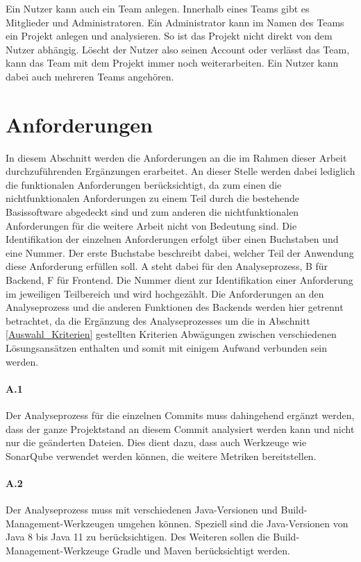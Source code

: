 \documentclass[
	oneside,  %
	ngerman, 
	final, 
	11pt, 
	a4paper, 
	1.1headlines, 
	headinclude=false, 
	footinclude=false, 
	mpinclude=false, 
	pagesize, 
	onecolumn, 
	titlepage, 
	parskip=half, 
	headsepline, 
	chapterprefix=false, 
	version=first, 
	listof=totoc, 
	bibliography=totoc, 
	toc=graduated, 
	fleqn
]{scrbook}
\begin{document}
Ein Nutzer kann auch ein Team anlegen.
Innerhalb eines Teams gibt es Mitglieder und Administratoren.
Ein Administrator kann im Namen des Teams ein Projekt anlegen und analysieren.
So ist das Projekt nicht direkt von dem Nutzer abhängig.
Löscht der Nutzer also seinen Account oder verlässt das Team, kann das Team mit dem Projekt immer noch weiterarbeiten.
Ein Nutzer kann dabei auch mehreren Teams angehören.

\section{Anforderungen}
\label{Anforderungen}
In diesem Abschnitt werden die Anforderungen an die im Rahmen dieser Arbeit durchzuführenden Ergänzungen erarbeitet.
An dieser Stelle werden dabei lediglich die funktionalen Anforderungen berücksichtigt, da zum einen die nichtfunktionalen Anforderungen zu einem Teil durch die bestehende Basissoftware abgedeckt sind und zum anderen die nichtfunktionalen Anforderungen für die weitere Arbeit nicht von Bedeutung sind.
Die Identifikation der einzelnen Anforderungen erfolgt über einen Buchstaben und eine Nummer.
Der erste Buchstabe beschreibt dabei, welcher Teil der Anwendung diese Anforderung erfüllen soll.
\glqq A\grqq{} steht dabei für den Analyseprozess, \glqq B\grqq{} für Backend, \glqq F\grqq{} für Frontend.
Die Nummer dient zur Identifikation einer Anforderung im jeweiligen Teilbereich und wird hochgezählt.
Die Anforderungen an den Analyseprozess und die anderen Funktionen des Backends werden hier getrennt betrachtet, da die Ergänzung des Analyseprozesses um die in Abschnitt \ref{Auswahl_Kriterien} gestellten Kriterien Abwägungen zwischen verschiedenen Lösungsansätzen enthalten und somit mit einigem Aufwand verbunden sein werden.

\paragraph{A.1}
Der Analyseprozess für die einzelnen Commits muss dahingehend ergänzt werden, dass der ganze Projektstand an diesem Commit analysiert werden kann und nicht nur die geänderten Dateien.
Dies dient dazu, dass auch Werkzeuge wie SonarQube verwendet werden können, die weitere Metriken bereitstellen.

\paragraph{A.2}
Der Analyseprozess muss mit verschiedenen Java-Versionen und Build-Management-Werkzeugen umgehen können.
Speziell sind die Java-Versionen von Java 8 bis Java 11 zu berücksichtigen.
Des Weiteren sollen die Build-Management-Werkzeuge Gradle und Maven berücksichtigt werden.
\end{document}
